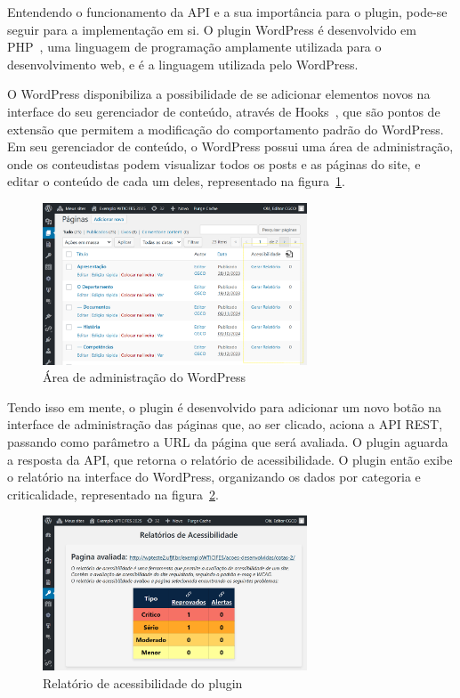 \documentclass[
	article,			%
	12pt,				%
	oneside,			%
	a4paper,			%
	section=TITLE,		%
	subsection=TITLE,	%
	english,			%
	brazil,				%
	sumario=tradicional
	]{abntex2}
\begin{document}
Entendendo o funcionamento da API e a sua importância para o
plugin, pode-se seguir para a implementação em si. O plugin WordPress
é desenvolvido em PHP~\cite{php}, uma linguagem de programação amplamente utilizada
para o desenvolvimento web, e é a linguagem utilizada pelo WordPress.

O WordPress disponibiliza a possibilidade de se adicionar elementos novos na interface
do seu gerenciador de conteúdo, através de Hooks~\cite{hooks}, que são pontos
de extensão que permitem a modificação do comportamento padrão do WordPress. Em seu
gerenciador de conteúdo, o WordPress possui uma área de administração, onde
os conteudistas podem visualizar todos os posts e as páginas do site, e editar o conteúdo
de cada um deles, representado na figura~\ref{fig:wp-admin}.
\begin{figure}[h]
    \centering
    \caption{Área de administração do WordPress}
    \label{fig:wp-admin}
    \includegraphics[width=0.7\textwidth]{imagem1.png}
\end{figure}

Tendo isso em mente, o plugin é desenvolvido para adicionar um novo botão na
interface de administração das páginas que, ao ser clicado, aciona a API REST,
passando como parâmetro a URL da página que será avaliada. O plugin aguarda a resposta da API, 
que retorna o relatório de acessibilidade. O plugin
então exibe o relatório na interface do WordPress, organizando os dados
por categoria e criticalidade, representado na figura~\ref{fig:relatorio}.

\begin{figure}[h]
    \centering
    \caption{Relatório de acessibilidade do plugin}
    \label{fig:relatorio}
\includegraphics[width=0.7\textwidth]{imagem2.png}
\end{figure}
\end{document}
